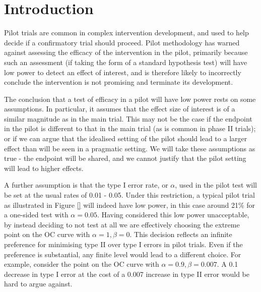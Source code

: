 \documentclass[sagev]{sagej}
\begin{document}

\maketitle

\section{Introduction}\label{sec:intro}

Pilot trials are common in complex intervention development, and used to help decide if a confirmatory trial should proceed. Pilot methodology has warned against assessing the efficacy of the intervention in the pilot, primarily because such an assessment (if taking the form of a standard hypothesis test) will have low power to detect an effect of interest, and is therefore likely to incorrectly conclude the intervention is not promising and terminate its development.

The conclusion that a test of efficacy in a pilot will have low power rests on some assumptions. In particular, it assumes that the effect size of interest is of a similar magnitude as in the main trial. This may not be the case if the endpoint in the pilot is different to that in the main trial (as is common in phase II trials); or if we can argue that the idealised setting of the pilot should lead to a larger effect than will be seen in a pragmatic setting. We will take these assumptions as true - the endpoint will be shared, and we cannot justify that the pilot setting will lead to higher effects.

A further assumption is that the type I error rate, or $\alpha$, used in the pilot test will be set at the usual rates of 0.01 - 0.05. Under this restriction, a typical pilot trial as illustrated in Figure \ref{} will indeed have low power, in this case around 21\% for a one-sided test with $\alpha = 0.05$. Having considered this low power unacceptable, by instead deciding to not test at all we are effectively choosing the extreme point on the OC curve with $\alpha = 1, \beta = 0$. This decision reflects an infinite preference for minimising type II over type I errors in pilot trials. Even if the preference is substantial, any finite level would lead to a different choice. For example, consider the point on the OC curve with $\alpha = 0.9, \beta = 0.007$. A 0.1 decrease in type I error at the cost of a 0.007 increase in type II error would be hard to argue against.
\end{document}
